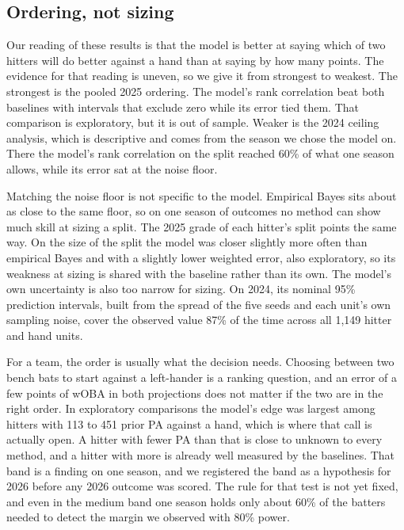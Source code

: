 \documentclass[11pt,letterpaper]{article}
\begin{document}
\subsection{Ordering, not sizing}
\label{sec:ordering}

Our reading of these results is that the model is better at saying which of two hitters will do better against a hand than at saying by how many points. The evidence for that reading is uneven, so we give it from strongest to weakest. The strongest is the pooled 2025 ordering. The model's rank correlation beat both baselines with intervals that exclude zero while its error tied them. That comparison is exploratory, but it is out of sample. Weaker is the 2024 ceiling analysis, which is descriptive and comes from the season we chose the model on. There the model's rank correlation on the split reached 60\% of what one season allows, while its error sat at the noise floor.

Matching the noise floor is not specific to the model. Empirical Bayes sits about as close to the same floor, so on one season of outcomes no method can show much skill at sizing a split. The 2025 grade of each hitter's split points the same way. On the size of the split the model was closer slightly more often than empirical Bayes and with a slightly lower weighted error, also exploratory, so its weakness at sizing is shared with the baseline rather than its own. The model's own uncertainty is also too narrow for sizing. On 2024, its nominal 95\% prediction intervals, built from the spread of the five seeds and each unit's own sampling noise, cover the observed value 87\% of the time across all 1,149 hitter and hand units.

For a team, the order is usually what the decision needs. Choosing between two bench bats to start against a left-hander is a ranking question, and an error of a few points of wOBA in both projections does not matter if the two are in the right order. In exploratory comparisons the model's edge was largest among hitters with 113 to 451 prior PA against a hand, which is where that call is actually open. A hitter with fewer PA than that is close to unknown to every method, and a hitter with more is already well measured by the baselines. That band is a finding on one season, and we registered the band as a hypothesis for 2026 before any 2026 outcome was scored. The rule for that test is not yet fixed, and even in the medium band one season holds only about 60\% of the batters needed to detect the margin we observed with 80\% power.
\end{document}
